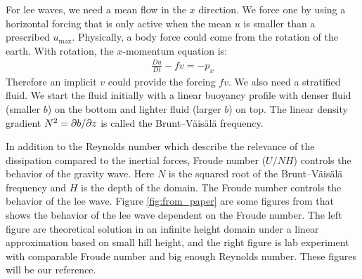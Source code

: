 \documentclass[11pt,letterpaper]{article}
\begin{document}
For lee waves, we need a mean flow in the $x$ direction. We force one by using a horizontal forcing that is only active when the mean $u$ is smaller than a prescribed $u_\text{max}$. Physically, a body force could come from the rotation of the earth. With rotation, the $x$-momentum equation is:
\begin{align}
    \frac{Du}{Dt} -fv = -p_x
\end{align}
Therefore an implicit $v$ could provide the forcing $fv$. We also need a stratified fluid. We start the fluid initially with a linear buoyancy profile with denser fluid (smaller $b$) on the bottom and lighter fluid (larger $b$) on top. The linear density gradient $N^2=\partial b/\partial z$ is called the Brunt–Väisälä frequency.

In addition to the Reynolds number which describe the relevance of the dissipation compared to the inertial forces, Froude number ($U/NH$) controls the behavior of the gravity wave. Here $N$ is the squared root of the Brunt–Väisälä frequency and $H$ is the depth of the domain. The Froude number controls the behavior of the lee wave. Figure \ref{fig:from_paper} are some figures from \cite{EiffBonneton_00} that shows the behavior of the lee wave dependent on the Froude number. The left figure are theoretical solution in an infinite height domain under a linear approximation based on small hill height, and the right figure is lab experiment with comparable Froude number and big enough Reynolds number. These figures will be our reference.
\end{document}
